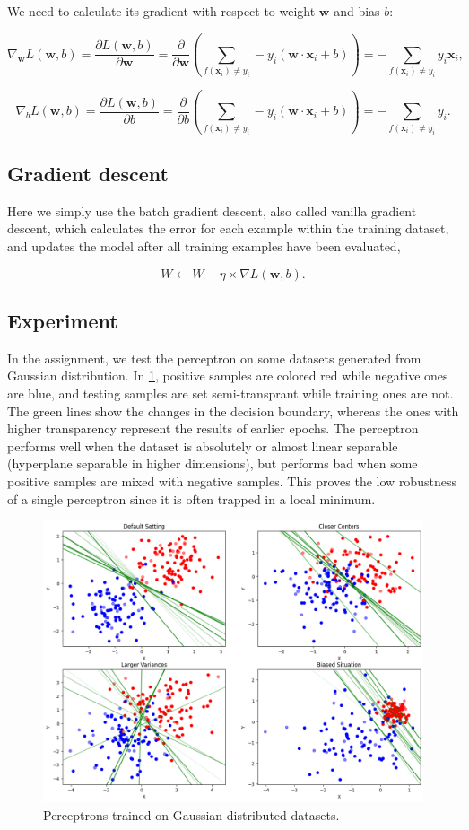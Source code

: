 \documentclass[12pt]{article}
\begin{document}
We need to calculate its gradient with respect to weight $\mathbf{w}$ and bias $b$:

$$
\nabla_\mathbf{w}L(\mathbf{w}, b)=\frac{\partial L(\mathbf{w}, b)}{\partial \mathbf{w}} = \frac{\partial}{\partial \mathbf{w}} \left( \sum_{f(\mathbf{x}_i)\not=y_i} - y_i (\mathbf{w} \cdot \mathbf{x}_i + b) \right) = - \sum_{f(\mathbf{x}_i)\not=y_i} y_i \mathbf{x}_i,
$$

$$
\nabla_{b}L(\mathbf{w}, b)=\frac{\partial L(\mathbf{w}, b)}{\partial b} = \frac{\partial}{\partial b} \left( \sum_{f(\mathbf{x}_i)\not=y_i} - y_i (\mathbf{w} \cdot \mathbf{x}_i + b) \right) = - \sum_{f(\mathbf{x}_i)\not=y_i} y_i.
$$

\subsection{Gradient descent}

Here we simply use the batch gradient descent, also called vanilla gradient descent, which calculates the error for each example within the training dataset, and updates the model after all training examples have been evaluated,

$$
W\leftarrow W-\eta\times\nabla L(\mathbf{w}, b).
$$

\subsection{Experiment}

In the assignment, we test the perceptron on some datasets generated from Gaussian distribution. In \cref{fig:sec1_exp1}, positive samples are colored red while negative ones are blue, and testing samples are set semi-transprant while training ones are not. The green lines show the changes in the decision boundary, whereas the ones with higher transparency represent the results of earlier epochs. The perceptron performs well when the dataset is absolutely or almost linear separable (hyperplane separable in higher dimensions), but performs bad when some positive samples are mixed with negative samples. This proves the low robustness of a single perceptron since it is often trapped in a local minimum.

\begin{figure}[tb]
    \centering
    \includegraphics[width=0.5\linewidth]{fig_sec1_exp1.png}
    \caption{Perceptrons trained on Gaussian-distributed datasets.}
    \label{fig:sec1_exp1}
\end{figure}
\end{document}
